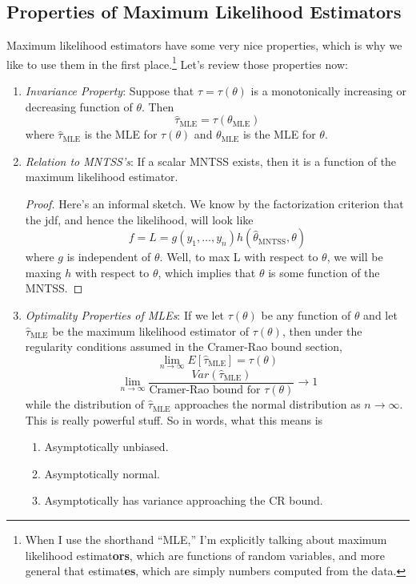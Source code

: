 \documentclass[a4paper,12pt]{scrartcl}
\begin{document}
\newpage
\subsection{Properties of Maximum Likelihood Estimators}

Maximum likelihood estimators have some very nice properties, which
is why we like to use them in the first place.\footnote{When I use
the shorthand ``MLE,'' I'm
explicitly talking about maximum likelihood estimat\textbf{ors},
which are functions of random variables, and more general that
estimat\textbf{es}, which are simply numbers computed from the data.}
Let's review those properties now:
\begin{enumerate}
   \item {\sl Invariance Property}: Suppose that $\tau = \tau(\theta)$
      is a monotonically increasing or decreasing function of 
      $\theta$. Then
      \[ \hat{\tau}_{\text{MLE}} = \tau\left(\theta_{\text{MLE}}\right)
	 \]
      where $\hat{\tau}_{\text{MLE}}$ is the MLE for $\tau(\theta)$
      and $\theta_{\text{MLE}}$ is the MLE for $\theta$.
   \item {\sl Relation to MNTSS's}: If a scalar MNTSS exists,
      then it is a function of the maximum likelihood estimator.

      \begin{proof} Here's an informal sketch. We know by the 
	 factorization criterion that the jdf, and hence the likelihood,
	 will look like
	    \[ f = L = g(y_1, \ldots, y_n) h(\hat{\theta}_\text{MNTSS},
	       \theta) \]
	 where $g$ is independent of $\theta$.
	 Well, to max L with respect to $\theta$, we will be maxing
	 $h$ with respect to $\theta$, which implies that $\theta$
	 is some function of the MNTSS. 
      \end{proof}
   \item {\sl Optimality Properties of MLEs}: If we let $\tau(\theta)$
      be any function of $\theta$ and let $\hat{\tau}_{\text{MLE}}$
      be the maximum likelihood estimator of $\tau(\theta)$, then
      under the regularity conditions assumed in the Cramer-Rao
      bound section, 
	 \[ \lim_{n\rightarrow \infty} E[\hat{\tau}_{\text{MLE}}] 
	 = \tau(\theta) \]
	 \[ \lim_{n\rightarrow \infty}
	    \frac{ Var(\hat{\tau}_{\text{MLE}})}{\text{Cramer-Rao
	    bound for $\tau(\theta)$}} \rightarrow 1 \]
      while the distribution of $\hat{\tau}_{\text{MLE}}$ approaches
      the normal distribution as $n\rightarrow \infty$. This is really
      powerful stuff. So in words, what this means is
      \begin{enumerate}
	 \item Asymptotically unbiased.
	 \item Asymptotically normal.
	 \item Asymptotically has variance approaching the CR bound.
      \end{enumerate}
\end{enumerate}
\end{document}
